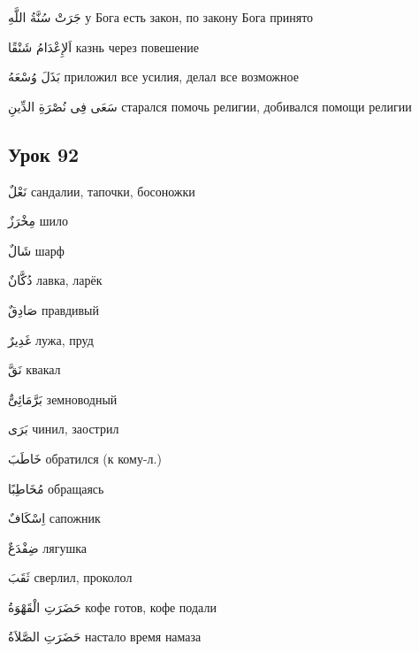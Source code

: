 \documentclass[a5paper]{article}
\newcommand\textstyleDropCaps[1]{#1}
\newcommand\textstyleCaptioncharacters[1]{#1}
\begin{document}
\textstyleCaptioncharacters{جَرَتْ سُنَّةُ اللَّهِ }\textstyleDropCaps{у Бога есть закон, по закону Бога принято‎}

\textstyleCaptioncharacters{اَلإِعْدَامُ شَنْقًا }\textstyleDropCaps{казнь че­рез повешение‎}

\textstyleCaptioncharacters{بَذَلَ وُسْعَهُ }\textstyleDropCaps{приложил все усилия, делал все возможное‎}

\textstyleCaptioncharacters{سَعَى فِى نُصْرَةِ الدِّينِ }\textstyleDropCaps{старался помочь религии, добивался помощи религии‎}

\subsection[Урок 92‎]{\textstyleDropCaps{Урок 92‎}}
\textstyleCaptioncharacters{نَعْلٌ }\textstyleDropCaps{сандалии, тапочки, бо­соножки ‎}

\textstyleCaptioncharacters{مِخْرَزٌ }\textstyleDropCaps{шило‎}

\textstyleCaptioncharacters{شَالٌ }\textstyleDropCaps{шарф‎}

\textstyleCaptioncharacters{دُكَّانٌ }\textstyleDropCaps{лавка, ларёк‎}

\textstyleCaptioncharacters{صَادِقٌ }\textstyleDropCaps{правдивый‎}

\textstyleCaptioncharacters{غَدِيرٌ }\textstyleDropCaps{лужа, пруд‎}

\textstyleCaptioncharacters{نَقَّ }\textstyleDropCaps{квакал‎}

\textstyleCaptioncharacters{بَرَّمَائِىٌّ }\textstyleDropCaps{земноводный‎}

\textstyleCaptioncharacters{بَرَى }\textstyleDropCaps{чинил, заострил‎}

\textstyleCaptioncharacters{خَاطَبَ }\textstyleDropCaps{обратился (к кому-л.)‎}

\textstyleCaptioncharacters{مُخَاطِبًا }\textstyleDropCaps{обращаясь‎}

\textstyleCaptioncharacters{اِسْكَافٌ }\textstyleDropCaps{сапожник‎}

\textstyleCaptioncharacters{ضِفْدَعٌ }\textstyleDropCaps{лягушка‎}

\textstyleCaptioncharacters{ثَقَبَ }\textstyleDropCaps{сверлил, проколол‎}

\textstyleCaptioncharacters{حَضَرَتِ الْقَهْوَةُ }\textstyleDropCaps{кофе го­тов, кофе подали‎}

\textstyleCaptioncharacters{حَضَرَتِ الصَّلاَةُ }\textstyleDropCaps{наста­ло время намаза‎}
\end{document}
